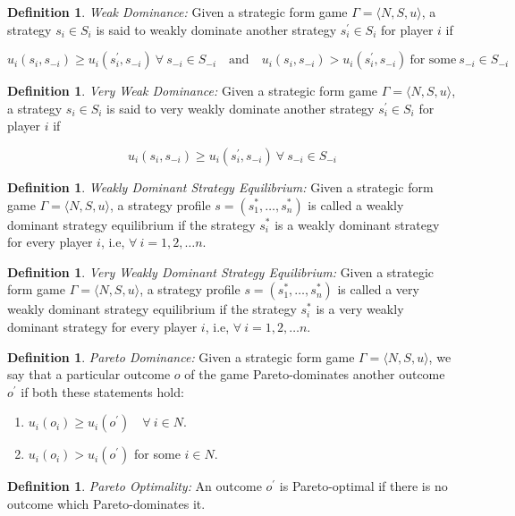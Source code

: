 \documentclass{article}
\theoremstyle{definition}
\newtheorem{defn}[theorem]{Definition}
\begin{document}
\begin{defn}
\textit{Weak Dominance:} Given a strategic form game $\Gamma = \langle N, S, u\rangle$, a strategy $s_i \in S_i$ is said to weakly dominate another strategy $s^{\prime}_i \in S_i$ for player $i$ if

\[
    u_i(s_i, s_{-i}) \geq u_i(s^{\prime}_i, s_{-i}) \: \forall \: s_{-i} \in S_{-i} \quad \text{and} \quad u_i(s_i, s_{-i}) > u_i(s^{\prime}_i, s_{-i}) \: \text{for some} \: s_{-i} \in S_{-i}
\]
\end{defn}
\begin{defn}
\textit{Very Weak Dominance:} Given a strategic form game $\Gamma = \langle N, S, u\rangle$, a strategy $s_i \in S_i$ is said to very weakly dominate another strategy $s^{\prime}_i \in S_i$ for player $i$ if

\[
    u_i(s_i, s_{-i}) \geq u_i(s^{\prime}_i, s_{-i}) \: \forall \: s_{-i} \in S_{-i}
\]
\end{defn}
\begin{defn}
\textit{Weakly Dominant Strategy Equilibrium:}  Given a strategic form game $\Gamma = \langle N, S, u \rangle$, a strategy profile $s = (s^{*}_1, \ldots , s^{*}_n)$ is called a weakly dominant strategy equilibrium if the strategy $s^{*}_i$ is a weakly dominant strategy for every player $i$, i.e, $\forall \: i = 1,2, \ldots n$.
\end{defn}
\begin{defn}
\textit{Very Weakly Dominant Strategy Equilibrium:}  Given a strategic form game $\Gamma = \langle N, S, u \rangle$, a strategy profile $s = (s^{*}_1, \ldots , s^{*}_n)$ is called a very weakly dominant strategy equilibrium if the strategy $s^{*}_i$ is a very weakly dominant strategy for every player $i$, i.e, $\forall \: i = 1,2, \ldots n$.
\end{defn}
\begin{defn}
    \textit{Pareto Dominance:} Given a strategic form game $\Gamma = \langle N, S, u \rangle$, we say that a particular outcome $o$ of the game Pareto-dominates another outcome $o^{\prime}$ if both these statements hold:
    \begin{enumerate}
        \item 
            $u_i(o_i) \geq u_i(o^{\prime}) \quad \forall \: i \in N$.
        \item 
            $ u_i(o_i) > u_i(o^{\prime})$ for some $i \in N$.
    \end{enumerate}
\end{defn}

\begin{defn}
    \textit{Pareto Optimality:} An outcome $o^{\prime}$ is Pareto-optimal if there is no outcome which Pareto-dominates it.
\end{defn}
\end{document}
